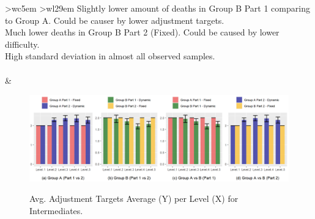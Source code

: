 \begin{table}[hbt!]
\begin{center}
\begin{tabular}{ >{\footnotesize}w{c}{5em} >{\footnotesize}w{l}{29em} }
{            \textbullet\space Slightly lower amount of deaths in Group B Part 1 comparing to Group A. Could be causer by lower adjustment targets. \\ %
            \textbullet\space Much lower deaths in Group B Part 2 (Fixed). Could be caused by lower difficulty. \\ %
            \textbullet\space High standard deviation in almost all observed samples. \\ %
        } \\
         & 
         \\
        \bottomrule
      \end{tabular}
    \end{center}
\end{table}

\begin{figure}[!ht]
    \begin{center}
    \caption{Avg. Adjustment Targets Average (Y) per Level (X) for Intermediates.}
        \includegraphics[width=\textwidth]{figures/adjustment_target_level-intermediate_players.png}
        \label{fig:result-metric-intermediate-adjustment-target-level}
    \end{center}
\end{figure}

